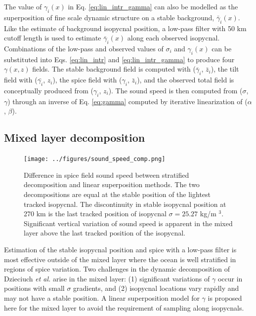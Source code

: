 \documentclass[preprint,NumberedRefs]{JASA}
\begin{document}
The value of $\gamma_i(x)$ in Eq. \eqref{eq:lin_intr_gamma} can also be modelled as the superposition of fine scale dynamic structure on a stable background, $\bar{\gamma}_i(x)$. Like the estimate of background isopycnal position, a low-pass filter with 50 km cutoff length is used to estimate $\bar{\gamma}_i(x)$ along each observed isopycnal. Combinations of the low-pass and observed values of $\sigma_i$ and $\gamma_i(x)$ can be substituted into Eqs. \eqref{eq:lin_intr} and \eqref{eq:lin_intr_gamma} to produce four $\gamma(x,z)$ fields. The stable background field is computed with ($\bar{\gamma}_i$, $\bar{z}_i$), the tilt field with ($\bar{\gamma_i}$, $z_i$), the spice field with ($\gamma_i$, $\bar{z}_i$), and the observed total field is conceptually produced from ($\gamma_i$, $z_i$). The sound speed is then computed from ($\sigma$, $\gamma$) through an inverse of Eq. \eqref{eq:gamma} computed by iterative linearization of ($\alpha$, $\beta$).


\subsection{Mixed layer decomposition}\label{ssec:ml_decomp}
\begin{figure}
\texttt{[image: ../figures/sound\_speed\_comp.png]}
    \caption{\label{fig:c_diff}{Difference in spice field sound speed between stratified decomposition and linear superposition methods. The two decompositions are equal at the stable position of the lightest tracked isopycnal. The discontinuity in stable isopycnal position at 270 km is the last tracked position of isopycnal $\sigma=25.27$ kg/m $^3$. Significant vertical variation of sound speed is apparent in the mixed layer above the last tracked position of the isopycnal.}}
\end{figure}

Estimation of the stable isopycnal position and spice with a low-pass filter is most effective outside of the mixed layer where the ocean is well stratified in regions of spice variation. Two challenges in the dynamic decomposition of Dzieciuch \emph{et al.}\citep{dzieciuch2004} arise in the mixed layer: (1) significant variations of $\gamma$ occur in positions with small $\sigma$ gradients, and (2) isopycnal locations vary rapidly and may not have a stable position. A linear superposition model for $\gamma$ is proposed here for the mixed layer to avoid the requirement of sampling along isopycnals.
\end{document}
